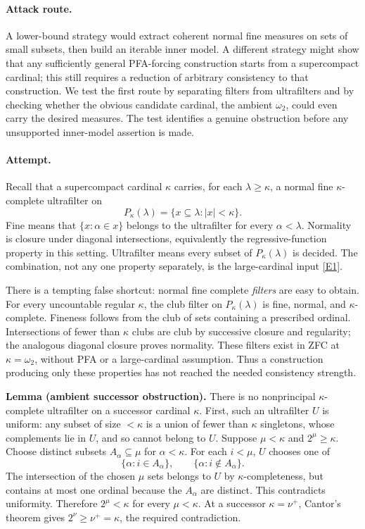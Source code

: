 \documentclass[11pt,a4paper]{article}
\newcommand{\eref}[2]{\hyperlink{extra:#1:#2}{[E#2]}}
\numberwithin{equation}{section}
\begin{document}
\paragraph{Attack route.}
A lower-bound strategy would extract coherent normal fine measures on sets of small subsets, then build an iterable inner model. A different strategy might show that any sufficiently general PFA-forcing construction starts from a supercompact cardinal; this still requires a reduction of arbitrary consistency to that construction. We test the first route by separating filters from ultrafilters and by checking whether the obvious candidate cardinal, the ambient $\omega_2$, could even carry the desired measures. The test identifies a genuine obstruction before any unsupported inner-model assertion is made.

\paragraph{Attempt.}
Recall that a supercompact cardinal $\kappa$ carries, for each $\lambda\ge\kappa$, a normal fine $\kappa$-complete ultrafilter on
\[
 P_\kappa(\lambda)=\{x\subseteq\lambda:|x|<\kappa\}.
\]
Fine means that $\{x:\alpha\in x\}$ belongs to the ultrafilter for every $\alpha<\lambda$. Normality is closure under diagonal intersections, equivalently the regressive-function property in this setting. Ultrafilter means every subset of $P_\kappa(\lambda)$ is decided. The combination, not any one property separately, is the large-cardinal input \eref{193}{1}.

There is a tempting false shortcut: normal fine complete \emph{filters} are easy to obtain. For every uncountable regular $\kappa$, the club filter on $P_\kappa(\lambda)$ is fine, normal, and $\kappa$-complete. Fineness follows from the club of sets containing a prescribed ordinal. Intersections of fewer than $\kappa$ clubs are club by successive closure and regularity; the analogous diagonal closure proves normality. These filters exist in ZFC at $\kappa=\omega_2$, without PFA or a large-cardinal assumption. Thus a construction producing only these properties has not reached the needed consistency strength.

\textbf{Lemma (ambient successor obstruction).} There is no nonprincipal $\kappa$-complete ultrafilter on a successor cardinal $\kappa$.
First, such an ultrafilter $U$ is uniform: any subset of size $<\kappa$ is a union of fewer than $\kappa$ singletons, whose complements lie in $U$, and so cannot belong to $U$.
Suppose $\mu<\kappa$ and $2^\mu\ge\kappa$. Choose distinct subsets $A_\alpha\subseteq\mu$ for $\alpha<\kappa$. For each $i<\mu$, $U$ chooses one of
\[
 \{\alpha:i\in A_\alpha\},\qquad\{\alpha:i\notin A_\alpha\}.
\]
The intersection of the chosen $\mu$ sets belongs to $U$ by $\kappa$-completeness, but contains at most one ordinal because the $A_\alpha$ are distinct. This contradicts uniformity. Therefore $2^\mu<\kappa$ for every $\mu<\kappa$. At a successor $\kappa=\nu^+$, Cantor's theorem gives $2^\nu\ge\nu^+=\kappa$, the required contradiction.
\end{document}
